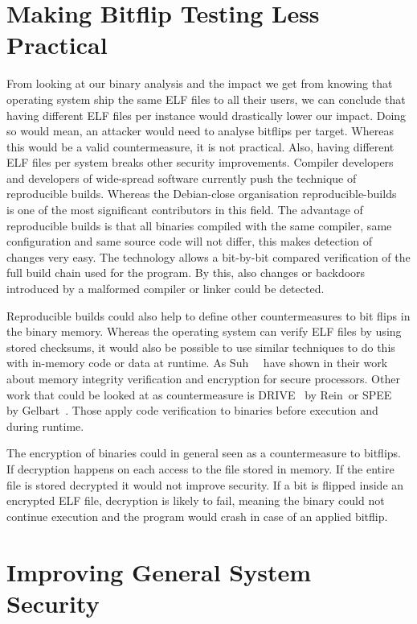 \section{Making Bitflip Testing Less Practical}

From looking at our binary analysis and the impact we get from knowing that
operating system ship the same ELF files to all their users, we can conclude
that having different ELF files per instance would drastically lower our impact.
Doing so would mean, an attacker would need to analyse bitflips per target.
Whereas this would be a valid countermeasure, it is not practical. Also, having
different ELF files per system breaks other security improvements. Compiler
developers and developers of wide-spread software currently push the technique
of reproducible builds. Whereas the Debian-close organisation
reproducible-builds~\cite{reprobuilds} is one of the most significant
contributors in this field. The advantage of reproducible builds is that all
binaries compiled with the same compiler, same configuration and same
source code will not differ, this makes detection of changes very easy. The
technology allows a bit-by-bit compared verification of the full build chain
used for the program. By this, also changes or backdoors introduced by a
malformed compiler or linker could be detected.

Reproducible builds could also help to define other countermeasures to bit flips
in the binary memory. Whereas the operating system can verify ELF files by using
stored checksums, it would also be possible to use similar techniques to do this
with in-memory code or data at runtime. As Suh~\etal~\cite{memintegrity} have
shown in their work about memory integrity verification and encryption for
secure processors. Other work that could be looked at as countermeasure is
DRIVE~\cite{drive} by Rein~\etal or SPEE~\cite{spee} by Gelbart~\etal. Those apply
code verification to binaries before execution and during runtime.

The encryption of binaries could in general seen as a countermeasure to
bitflips. If decryption happens on each access to the file stored in memory. If
the entire file is stored decrypted it would not improve security. If a bit is
flipped inside an encrypted ELF file, decryption is likely to fail, meaning the
binary could not continue execution and the program would crash in case of an
applied bitflip.

\section{Improving General System Security}


